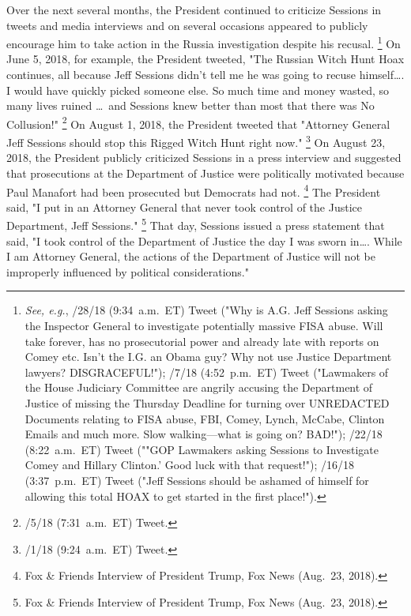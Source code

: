 {Over the next several months, the President continued to criticize Sessions in tweets and media interviews and on several occasions appeared to publicly encourage him to take action in the Russia investigation despite his recusal.%
\footnote{\textit{See, e.g.}, /28/18 (9:34~a.m.~ET) Tweet ("Why is A.G. Jeff Sessions asking the Inspector General to investigate potentially massive FISA abuse.
Will take forever, has no prosecutorial power and already late with reports on Comey etc.
Isn't the I.G. an Obama guy?
Why not use Justice Department lawyers?
DISGRACEFUL!");
/7/18 (4:52~p.m.~ET) Tweet ("Lawmakers of the House Judiciary Committee are angrily accusing the Department of Justice of missing the Thursday Deadline for turning over UNREDACTED Documents relating to FISA abuse, FBI, Comey, Lynch, McCabe, Clinton Emails and much more.
Slow walking---what is going on? BAD!");
/22/18 (8:22~a.m.~ET) Tweet (""GOP Lawmakers asking Sessions to Investigate Comey and Hillary Clinton.' \@FoxNews Good luck with that request!");
/16/18 (3:37~p.m.~ET) Tweet ("Jeff Sessions should be ashamed of himself for allowing this total HOAX to get started in the first place!").}
On June 5, 2018, for example, the President tweeted, "The Russian Witch Hunt Hoax continues, all because Jeff Sessions didn't tell me he was going to recuse himself\dots. I would have quickly picked someone else.
So much time and money wasted, so many lives ruined \dots\ and Sessions knew better than most that there was No Collusion!"%
\footnote{/5/18 (7:31~a.m.~ET) Tweet.}
On August 1, 2018, the President tweeted that "Attorney General Jeff Sessions should stop this Rigged Witch Hunt right now."%
\footnote{/1/18 (9:24~a.m.~ET) Tweet.}
On August 23, 2018, the President publicly criticized Sessions in a press interview and suggested that prosecutions at the Department of Justice were politically motivated because Paul Manafort had been prosecuted but Democrats had not.%
\footnote{Fox \& Friends Interview of President Trump, Fox News (Aug.~23, 2018).}
The President said, "I put in an Attorney General that never took control of the Justice Department, Jeff Sessions."%
\footnote{Fox \& Friends Interview of President Trump, Fox News (Aug.~23, 2018).}
That day, Sessions issued a press statement that said, "I took control of the Department of Justice the day I was sworn in\dots.
While I am Attorney General, the actions of the Department of Justice will not be improperly influenced by political considerations."%
}
